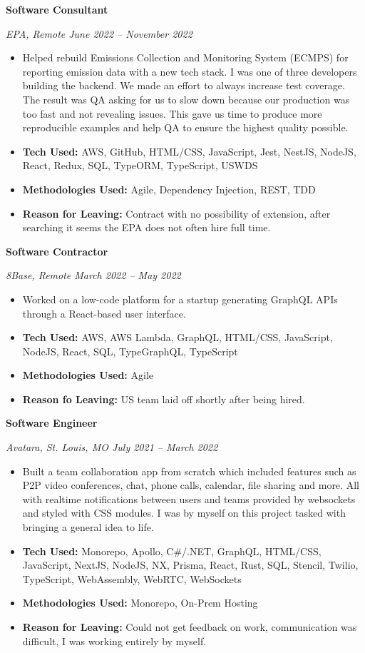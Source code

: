 \documentclass[a4ppaper, 10pt]{article}
\newcommand{\subheading}[1]{\vspace{2pt}\noindent\textbf{#1}\par}
\begin{document}
	\subheading{Software Consultant}
	\raggedright
	\textit{EPA, Remote \hfill June 2022 -- November 2022}
	\begin{itemize}[itemsep=0pt, topsep=2pt]
		\item Helped rebuild Emissions Collection and Monitoring System (ECMPS) for reporting emission data with a new tech stack. I was one of three developers building the backend. We made an effort to always increase test coverage. The result was QA asking for us to slow down because our production was too fast and not revealing issues. This gave us time to produce more reproducible examples and help QA to ensure the highest quality possible.
		\item \textbf{Tech Used:}  AWS, GitHub, HTML/CSS, JavaScript, Jest, NestJS, NodeJS, React, Redux, SQL, TypeORM, TypeScript, USWDS
		\item \textbf{Methodologies Used:} Agile, Dependency Injection, REST, TDD
		\item \textbf{Reason for Leaving:} Contract with no possibility of extension, after searching it seems the EPA does not often hire full time.
	\end{itemize}
	
	\subheading{Software Contractor}
	\raggedright
	\textit{8Base, Remote \hfill March 2022 -- May 2022}
	\begin{itemize}[itemsep=0pt, topsep=2pt]
		\item Worked on a low-code platform for a startup generating GraphQL APIs through a React-based user interface.
		\item \textbf{Tech Used:}  AWS, AWS Lambda, GraphQL, HTML/CSS, JavaScript, NodeJS, React, SQL, TypeGraphQL, TypeScript
		\item \textbf{Methodologies Used:} Agile
		\item \textbf{Reason fo Leaving:} US team laid off shortly after being hired.
	\end{itemize}
	
	\subheading{Software Engineer}
	\raggedright
	\textit{Avatara, St. Louis, MO \hfill July 2021 -- March 2022}
	\begin{itemize}[itemsep=0pt, topsep=2pt]
		\item Built a team collaboration app from scratch which included features such as P2P video conferences, chat, phone calls, calendar, file sharing and more. All with realtime notifications between users and teams provided by websockets and styled with CSS modules. I was by myself on this project tasked with bringing a general idea to life.
		\item \textbf{Tech Used:}  Monorepo, Apollo, C\#/.NET, GraphQL, HTML/CSS, JavaScript, NextJS, NodeJS, NX, Prisma, React, Rust, SQL, Stencil, Twilio, TypeScript, WebAssembly, WebRTC, WebSockets
		\item \textbf{Methodologies Used:} Monorepo, On-Prem Hosting
		\item \textbf{Reason for Leaving:} Could not get feedback on work, communication was difficult, I was working entirely by myself.
	\end{itemize}
	
\end{document}
